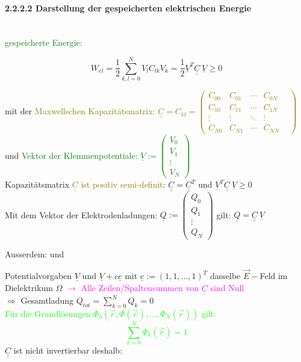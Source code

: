 \documentclass[]{article}
\newcommand{\C}{\ensuremath{\mathbb C}}
\newcommand{\Q}{\ensuremath{\mathbb Q}}
\begin{document}
\paragraph{2.2.2.2 Darstellung der gespeicherten elektrischen Energie }
	\ \\\textcolor{Green}{gespeicherte Energie:} 
	\begin{boxedminipage}[Green]{7cm}
		$$W_{el}=\frac{1}{2}\sum\limits_{k,l=0}^{N}V_l C_{lk}V_k= \frac{1}{2}\underline{V}^T\underline{\underline{C}}\ \underline{V}\geq 0$$
	\end{boxedminipage}

	mit der \textcolor{Olive}{Maxwellschen Kapazitätsmatrix: 
	$\underline{\underline{C}}=C_{kl}=\begin{pmatrix}C_{00}&C_{01}&\dotsm&C_{0N}\\C_{10}&C_{11}&\dotsm&C_{1N}\\\vdots&\vdots&\ddots
	&\vdots\\C_{N0}&C_{N1}&\dotsm&C_{NN}&\end{pmatrix}$}
	\\und \textcolor{Green}{Vektor der Klemmenpotentiale: $\underline{V}:=\begin{pmatrix}V_0\\V_1\\\vdots\\V_N\end{pmatrix}$}
	\\Kapazitätsmatrix \textcolor{Olive}{$\underline{\underline{C}}$ ist positiv semi-definit}: $\underline{\underline{C}}=\underline{\underline{C}}^T$ und $\underline{V}^T\underline{\underline{C}}\ \underline{V}\geq 0$
	\\Mit dem Vektor der Elektrodenladungen: $\underline{Q}:=\begin{pmatrix}Q_0\\Q_1\\\vdots \\Q_N\end{pmatrix}$ gilt: $\underline{Q}= \underline{\underline{C}}\ \underline{V}$

\newpage

	Ausserdem: 
	und 

	Potentialvorgaben $\underline{V}$ und $\underline{V}+c\underline{e}$ mit $\underline{e}:=(1,1, \dots,1)^T$ dasselbe $\vec{E}-$Feld im 
	\\Dielektrikum $\Omega$ \textcolor{magenta}{$\rightarrow$ Alle Zeilen/Spaltensummen von $\underline{\underline{C}}$ sind Null}
	\\$\Rightarrow$ Gesamtladung $Q_{tot}=\sum\limits_{k=0}^{N}Q_k=0$
	\\\textcolor{lime}{Für die Grundlösungen $\Phi_0(\vec{r},\Phi(\vec{r}),\dots,\Phi_N(\vec{r}))$ gilt: 
	$$\sum\limits_{k=0}^{N}\Phi_k(\vec{r})=1$$}
	$\underline{\underline{C}}$ ist nicht invertierbar deshalb: 
	
\end{document}
